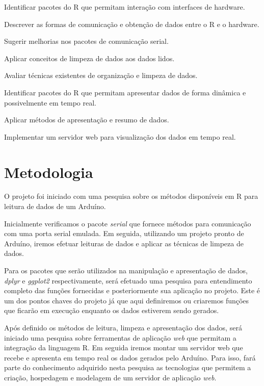\documentclass[
	article,			%
	11pt,				%
	oneside,			%
	a4paper,			%
	english,			%
	brazil,				%
	sumario=tradicional
	]{abntex2}
\begin{document}
\begin{alineas}
  
  \item Identificar pacotes do R que permitam interação com interfaces de hardware.
  \item Descrever as formas de comunicação e obtenção de dados entre o R e o hardware.
  \item Sugerir melhorias nos pacotes de comunicação serial.
  \item Aplicar conceitos de limpeza de dados aos dados lidos.
  \item Avaliar técnicas existentes de organização e limpeza de dados.
  \item Identificar pacotes do R que permitam apresentar dados de forma dinâmica e 
  possivelmente em tempo real.
  \item Aplicar métodos de apresentação e resumo de dados.
  \item Implementar um servidor web para visualização dos dados em tempo real.
  
\end{alineas}

\section[Metodologia]{Metodologia}

O projeto foi iniciado com uma pesquisa sobre os métodos disponíveis em R para 
leitura de dados de um Arduíno. 

Inicialmente verificamos o pacote 
\emph{serial} \cite{Seilmayer2017} que fornece métodos para comunicação com uma porta serial emulada. Em seguida, 
utilizando um projeto pronto de Arduíno, iremos efetuar leituras de dados e 
aplicar as técnicas de limpeza de dados. 

Para os pacotes que serão utilizados na manipulação e apresentação de dados, 
\emph{dplyr} e \emph{ggplot2} respectivamente, será efetuado uma pesquisa para 
entendimento completo das funções fornecidas e posteriormente sua aplicação no 
projeto. Este é um dos pontos chaves do projeto já que aqui definiremos ou 
criaremos funções que ficarão em execução enquanto os dados estiverem sendo 
gerados.

Após definido os métodos de leitura, limpeza e apresentação dos dados, será 
iniciado uma pesquisa sobre ferramentas de aplicação \emph{web} que permitam a 
integração da linguagem R. Em seguida iremos montar um servidor web que recebe e 
apresenta em tempo real os dados gerados pelo Arduíno. Para isso, fará parte do 
conhecimento adquirido nesta pesquisa as tecnologias que permitem a criação, 
hospedagem e modelagem de um servidor de aplicação \emph{web}.
\end{document}
